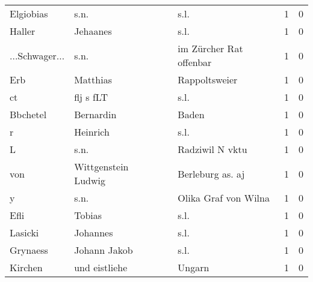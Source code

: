 \begin{tabular}{llllrr}
                Elgiobias &                               s.n. &             &                                        s.l. &          1 &         0 \\
                   Haller &                           Jehaanes &             &                                        s.l. &          1 &         0 \\
           ...Schwager... &                               s.n. &             &                     im Zürcher Rat offenbar &          1 &         0 \\
                      Erb &                           Matthias &             &                               Rappoltsweier &          1 &         0 \\
                       ct &                          flj s fLT &             &                                        s.l. &          1 &         0 \\
                 Bbchetel &                          Bernardin &             &                                       Baden &          1 &         0 \\
                        r &                           Heinrich &             &                                        s.l. &          1 &         0 \\
                        L &                               s.n. &             &                             Radziwil N vktu &          1 &         0 \\
                      von &                Wittgenstein Ludwig &             &                            Berleburg as. aj &          1 &         0 \\
                        y &                               s.n. &             &                        Olika Graf von Wilna &          1 &         0 \\
                     Efli &                             Tobias &             &                                        s.l. &          1 &         0 \\
                  Lasicki &                           Johannes &             &                                        s.l. &          1 &         0 \\
                 Grynaess &                       Johann Jakob &             &                                        s.l. &          1 &         0 \\
                  Kirchen &                      und eistliehe &             &                                      Ungarn &          1 &         0 \\

\end{tabular}

